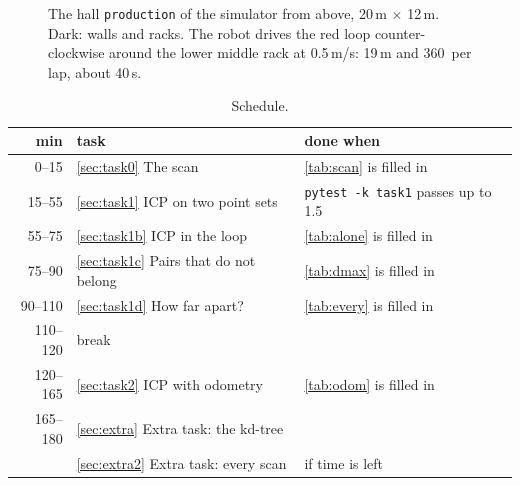\documentclass[11pt,a4paper,parskip=half]{scrartcl}
\newcommand{\thema}[1]{\texttt{#1}}
\begin{document}
\begin{figure}[ht]
  \centering
  
  \caption{The hall \thema{production} of the simulator from above, 20\,m \(\times\) 12\,m. Dark: walls and
    racks. The robot drives the red loop counter-clockwise around the lower middle rack at 0.5\,m/s:
    19\,m and 360\,\textdegree{} per lap, about 40\,s.}
  \label{fig:hall}
\end{figure}

\begin{table}[ht]\centering
\caption{Schedule.}
\label{tab:schedule}
\begin{tabular}{@{}rll@{}}
\toprule
min & task & done when \\
\midrule
0--15 & \cref{sec:task0} The scan & \cref{tab:scan} is filled in \\
15--55 & \cref{sec:task1} ICP on two point sets & \thema{pytest -k task1} passes up to 1.5 \\
55--75 & \cref{sec:task1b} ICP in the loop & \cref{tab:alone} is filled in \\
75--90 & \cref{sec:task1c} Pairs that do not belong & \cref{tab:dmax} is filled in \\
90--110 & \cref{sec:task1d} How far apart? & \cref{tab:every} is filled in \\
110--120 & break & \\
120--165 & \cref{sec:task2} ICP with odometry & \cref{tab:odom} is filled in \\
165--180 & \cref{sec:extra} Extra task: the kd-tree & \\
& \cref{sec:extra2} Extra task: every scan & if time is left \\
\bottomrule
\end{tabular}
\end{table}
\end{document}

